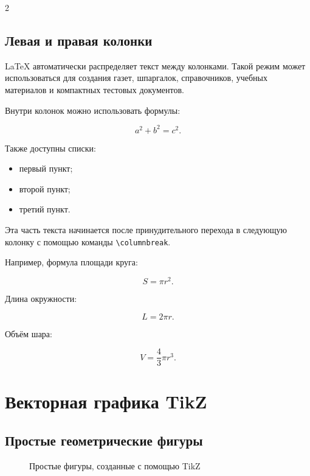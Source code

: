 \documentclass[12pt,a4paper]{article}
\theoremstyle{definition}
\theoremstyle{remark}
\begin{document}
\begin{multicols}{2}

\subsection*{Левая и правая колонки}

LaTeX автоматически распределяет текст между колонками. Такой режим
может использоваться для создания газет, шпаргалок, справочников,
учебных материалов и компактных тестовых документов.

Внутри колонок можно использовать формулы:

\[
    a^2+b^2=c^2.
\]

Также доступны списки:

\begin{itemize}
    \item первый пункт;
    \item второй пункт;
    \item третий пункт.
\end{itemize}

\columnbreak

Эта часть текста начинается после принудительного перехода в следующую
колонку с помощью команды \texttt{\textbackslash columnbreak}.

Например, формула площади круга:

\[
    S=\pi r^2.
\]

Длина окружности:

\[
    L=2\pi r.
\]

Объём шара:

\[
    V=\frac{4}{3}\pi r^3.
\]

\end{multicols}


\section{Векторная графика TikZ}

\subsection{Простые геометрические фигуры}

\begin{figure}[H]
    \centering


    \caption{Простые фигуры, созданные с помощью TikZ}
\end{figure}
\end{document}
